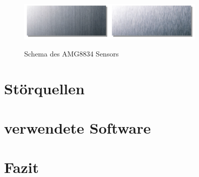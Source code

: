 \begin{figure}[H]
	\centering
	\includegraphics[width=0.8\textwidth]
	{fig/Edelstahl_matt.PNG}
	\caption[Schema des AMG8834 Sensors]{Schema des AMG8834 Sensors} \protect\cite{Edelstahl}
	\label{fig:Edelstahlmatt}
	
	
\end{figure}

\section{Störquellen}

\section{verwendete Software}



\section{Fazit}

